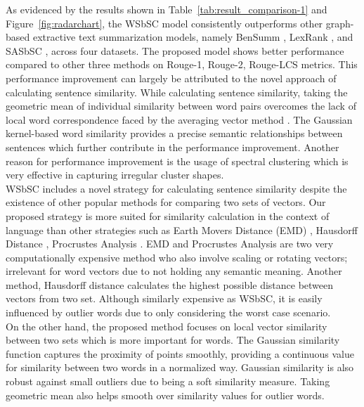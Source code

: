 \documentclass[acmlarge]{acmart}
\begin{document}
As evidenced by the results shown in Table~\ref{tab:result_comparison-1} and Figure~\ref{fig:radarchart}, the WSbSC model consistently outperforms other graph-based extractive text summarization models, namely BenSumm \cite{das-2022-tfidf}, LexRank \cite{Erkan-lexRank-2004}, and SASbSC \cite{roychowdhury-etal-2022-spectral-base}, across four datasets. The proposed model shows better performance compared to other three methods on Rouge-1, Rouge-2, Rouge-LCS metrics. This performance improvement can largely be attributed to the novel approach of calculating sentence similarity. While calculating sentence similarity, taking the geometric mean of individual similarity between word pairs overcomes the lack of local word correspondence faced by the averaging vector method \cite{roychowdhury-etal-2022-spectral-base}. The Gaussian kernel-based word similarity provides a precise semantic relationships between sentences which further contribute in the performance improvement. Another reason for performance improvement is the usage of spectral clustering which is very effective in capturing irregular cluster shapes.\\

WSbSC includes a novel strategy for calculating sentence similarity despite the existence of other popular methods for comparing two sets of vectors. Our proposed strategy is more suited for similarity calculation in the context of language than other strategies such as Earth Movers Distance (EMD) \cite{Rubner-19998-emd}, Hausdorff Distance \cite{hausdorff-1914-hausdorff-distance}, Procrustes Analysis \cite{Gower-1975-procrustes-distance}. EMD \cite{Rubner-19998-emd} and Procrustes Analysis \cite{Gower-1975-procrustes-distance} are two very computationally expensive method who also involve scaling or rotating vectors; irrelevant for word vectors due to not holding any semantic meaning. Another method, Hausdorff distance \cite{hausdorff-1914-hausdorff-distance} calculates the highest possible distance between vectors from two set. Although similarly expensive as WSbSC, it is easily influenced by outlier words due to only considering the worst case scenario.\\

On the other hand, the proposed method focuses on local vector similarity between two sets which is more important for words. The Gaussian similarity function captures the proximity of points smoothly, providing a continuous value for similarity between two words in a normalized way. Gaussian similarity is also robust against small outliers due to being a soft similarity measure. Taking geometric mean also helps smooth over similarity values for outlier words.\\
\end{document}
